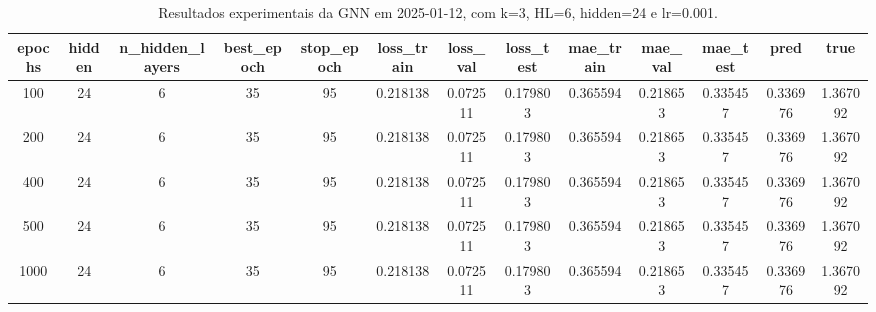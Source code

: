 \begin{table}[h]
\centering
\caption{Resultados experimentais da GNN em 2025-01-12, com k=3, HL=6, hidden=24 e lr=0.001.}
\label{tab:gnn_results_k3_hl6_h24_d20250112}
\begin{tabular}{ccccccccccccc}
\toprule
epochs & hidden & n\_hidden\_layers & best\_epoch & stop\_epoch & loss\_train & loss\_val & loss\_test & mae\_train & mae\_val & mae\_test & pred & true \\
\midrule
100 & 24 & 6 & 35 & 95 & 0.218138 & 0.072511 & 0.179803 & 0.365594 & 0.218653 & 0.335457 & 0.336976 & 1.367092 \\
200 & 24 & 6 & 35 & 95 & 0.218138 & 0.072511 & 0.179803 & 0.365594 & 0.218653 & 0.335457 & 0.336976 & 1.367092 \\
400 & 24 & 6 & 35 & 95 & 0.218138 & 0.072511 & 0.179803 & 0.365594 & 0.218653 & 0.335457 & 0.336976 & 1.367092 \\
500 & 24 & 6 & 35 & 95 & 0.218138 & 0.072511 & 0.179803 & 0.365594 & 0.218653 & 0.335457 & 0.336976 & 1.367092 \\
1000 & 24 & 6 & 35 & 95 & 0.218138 & 0.072511 & 0.179803 & 0.365594 & 0.218653 & 0.335457 & 0.336976 & 1.367092 \\
\bottomrule
\end{tabular}
\end{table}
